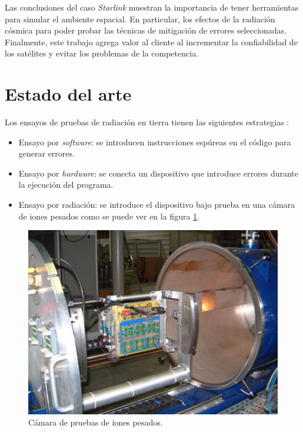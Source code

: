 Las conclusiones del caso \emph{Starlink} muestran la importancia de tener herramientas para simular el ambiente espacial.
En particular, los efectos de la radiación cósmica para poder probar las técnicas de mitigación de errores seleccionadas.
Finalmente, este trabajo agrega valor al cliente al incrementar la confiabilidad de los satélites y evitar los problemas de la competencia.

\newpage

\section{Estado del arte}
\label{sec:arte}

Los ensayos de pruebas de radiación en tierra tienen las siguientes estrategias \citep{ARTICLE:velazco}:
\begin{itemize}
    \item Ensayo por \emph{software}: se introducen instrucciones espúreas en el código para generar errores.
    \item Ensayo por \emph{hardware}: se conecta un dispositivo que introduce errores durante la ejecución del programa.
    \item Ensayo por radiación: se introduce el dispositivo bajo prueba en una cámara de iones pesados como se puede ver en la figura \ref{fig:iones}.
\end{itemize}

\begin{figure}[htbp]
	\centering
	\includegraphics[width=\textwidth]{./Figures/heavy_ion_latchup_tests_in_louvain_la_neuve.jpg}
    \caption{Cámara de pruebas de iones pesados\protect\footnotemark.}
	\label{fig:iones}
\end{figure}

